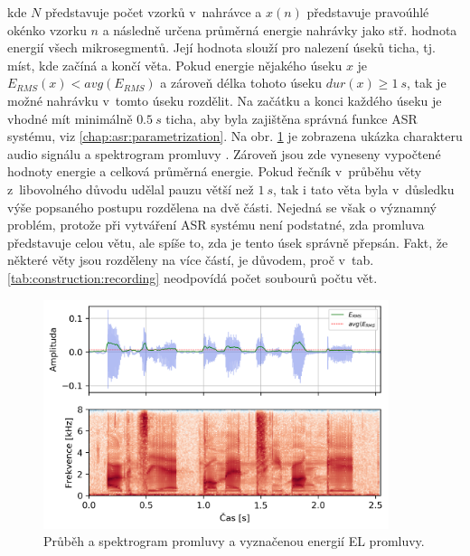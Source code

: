 \noindent kde $N$ představuje počet vzorků v~nahrávce a $x(n)$ představuje pravoúhlé okénko vzorku $n$ a následně určena průměrná energie nahrávky jako stř. hodnota energií všech mikrosegmentů.
Její hodnota slouží pro nalezení úseků ticha, tj. míst, kde začíná a končí věta.
Pokud energie nějakého úseku $x$ je $E_{RMS}(x) < avg(E_{RMS})$ a zároveň délka tohoto úseku $dur(x) \geq 1\ s$, tak je možné nahrávku v~tomto úseku rozdělit. Na začátku a konci každého úseku je vhodné mít minimálně $0.5\ s$ ticha, aby byla zajištěna správná funkce ASR systému, viz \ref{chap:asr:parametrization}.
Na obr. \ref{fig:construction:el_speech} je zobrazena ukázka charakteru audio signálu a spektrogram promluvy \textit{}.
Zároveň jsou zde vyneseny vypočtené hodnoty energie a celková průměrná energie.
Pokud řečník v~průběhu věty z~libovolného důvodu udělal pauzu větší než $1\ s$, tak i tato věta byla v~důsledku výše popsaného postupu rozdělena na dvě části.
Nejedná se však o významný problém, protože při vytváření ASR systému není podstatné, zda promluva představuje celou větu, ale spíše to, zda je tento úsek správně přepsán.
Fakt, že některé věty jsou rozděleny na více částí, je důvodem, proč v~tab. \ref{tab:construction:recording} neodpovídá počet soubourů počtu vět.

\begin{figure}[hbpt]
  \centering
  \includegraphics[width=0.9\textwidth]{./ch5-construction/img/energy_spec_el.png}
  \caption[Průběh a spektrogram EL promluvy.]{Průběh a spektrogram promluvy a vyznačenou energií EL promluvy.}
  \label{fig:construction:el_speech}
\end{figure}

